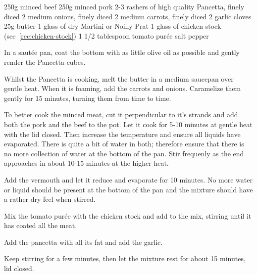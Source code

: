 \label{rec:bolognese}

\begin{ingreds}
	250g minced beef
	250g minced pork
	2-3 rashers of high quality Pancetta, finely diced
     	2 medium onions, finely diced
	2 medium carrots, finely diced
	2 garlic cloves
     	25g butter
     	1 glass of dry Martini or Noilly Prat
	1 glass of chicken stock (see~\ref{rec:chicken-stock})
	1 1/2 tablespoon tomato pur\'ee
	salt
	pepper

\end{ingreds}

\begin{method}
	In a saut\'ee pan, coat the bottom with as little olive oil as possible and gently render the Pancetta cubes.

     	Whilst the Pancetta is cooking, melt  the butter in a medium saucepan over gentle heat.  When it is foaming, add the carrots and onions.  Caramelize them gently for 15 minutes, turning them from time to time.

	To better cook the minced meat, cut it perpendicular to it's strands and add both the pork and the beef to the pot.  Let it cook for 5-10 minutes at gentle heat with the lid closed.  Then increase the temperature and ensure all liquids have evaporated.  There is quite a bit of water in both; therefore ensure that there is no more collection of water at the bottom of the pan.  Stir frequenly as the end approaches in about 10-15 minutes at the higher heat.

	Add the vermouth and let it reduce and evaporate for 10 minutes.  No more water or liquid should be present at the bottom of the pan and the mixture should have a rather dry feel when stirred.

	Mix the tomato pur\'ee with the chicken stock and add to the mix, stirring until it has coated all the meat.

	Add the pancetta with all its fat and add the garlic.

	Keep stirring for a few minutes, then let the mixture rest for about 15 minutes, lid closed.
	
\end {method}